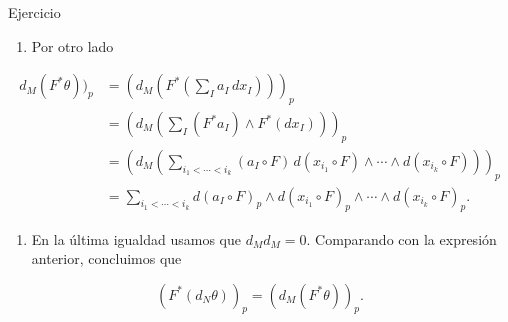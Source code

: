\begin{bookproof}{Ejercicio}
\begin{enumerate}[start=8]
\item Por otro lado
\end{enumerate}
\[
\begin{aligned} d_M(F^*\theta))_p&=\left(d_M\left(F^*\left(\sum_Ia_I\,dx_I\right)\right)\right)_p\\&=\left(d_M\left(\sum_I(F^*a_I)\wedge F^*(dx_I)\right)\right)_p\\&=\left(d_M\left(\sum_{i_1<\cdots<i_k}(a_I\circ F)\,d(x_{i_1}\circ F)\wedge\cdots\wedge d(x_{i_k}\circ F)\right)\right)_p\\&=\sum_{i_1<\cdots<i_k}d(a_I\circ F)_p\wedge d(x_{i_1}\circ F)_p\wedge\cdots\wedge d(x_{i_k}\circ F)_p.\end{aligned}
\]
\begin{enumerate}[start=9]
\item En la última igualdad usamos que $d_Md_M=0$. Comparando con la expresión anterior, concluimos que
\end{enumerate}
\[
(F^*(d_N\theta))_p=(d_M(F^*\theta))_p.
\]
\bookqed
\end{bookproof}
